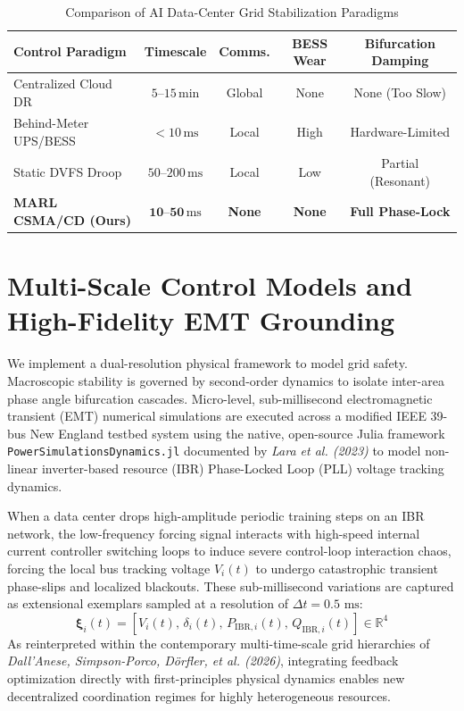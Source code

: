 \documentclass[11pt,fleqn]{article}
\begin{document}
\begin{table}[t]
\centering
\caption{Comparison of AI Data-Center Grid Stabilization Paradigms}
\label{tab:dc_lit_comparison}
\scriptsize
\setlength{\tabcolsep}{2.4pt}
\renewcommand{\arraystretch}{1.15}
\begin{tabular}{@{}lcccc@{}}
\toprule
\textbf{Control Paradigm} & \textbf{Timescale} & \textbf{Comms.} & \textbf{BESS Wear} & \textbf{Bifurcation Damping} \\
\midrule
Centralized Cloud DR~\cite{Wierman2014DR} & $5\text{--}15\,\mathrm{min}$ & Global & None & None (Too Slow) \\
Behind-Meter UPS/BESS~\cite{Govindan2011UPS} & $<10\,\mathrm{ms}$ & Local & High & Hardware-Limited \\
Static DVFS Droop~\cite{Li2016GridFriendly} & $50\text{--}200\,\mathrm{ms}$ & Local & Low & Partial (Resonant) \\
\textbf{MARL CSMA/CD (Ours)} & $\mathbf{10\text{--}50\,\mathrm{ms}}$ & \textbf{None} & \textbf{None} & \textbf{Full Phase-Lock} \\
\bottomrule
\end{tabular}
\end{table}

\section{Multi-Scale Control Models and High-Fidelity EMT Grounding}
We implement a dual-resolution physical framework to model grid safety. Macroscopic stability is governed by second-order dynamics to isolate inter-area phase angle bifurcation cascades. Micro-level, sub-millisecond electromagnetic transient (EMT) numerical simulations are executed across a modified IEEE 39-bus New England testbed system using the native, open-source Julia framework \texttt{PowerSimulationsDynamics.jl} documented by \textit{Lara et al. (2023)} to model non-linear inverter-based resource (IBR) Phase-Locked Loop (PLL) voltage tracking dynamics. 

When a data center drops high-amplitude periodic training steps on an IBR network, the low-frequency forcing signal interacts with high-speed internal current controller switching loops to induce severe control-loop interaction chaos, forcing the local bus tracking voltage $V_i(t)$ to undergo catastrophic transient phase-slips and localized blackouts. These sub-millisecond variations are captured as extensional exemplars sampled at a resolution of $\Delta t = 0.5\text{ ms}$:
\begin{equation}
\bm{\xi}_i(t) = \left[ V_i(t), \, \delta_i(t), \, P_{\text{IBR}, i}(t), \, Q_{\text{IBR}, i}(t) \right] \in \mathbb{R}^4
\end{equation}
As reinterpreted within the contemporary multi-time-scale grid hierarchies of \textit{Dall'Anese, Simpson-Porco, Dörfler, et al. (2026)}, integrating feedback optimization directly with first-principles physical dynamics enables new decentralized coordination regimes for highly heterogeneous resources.
\end{document}
